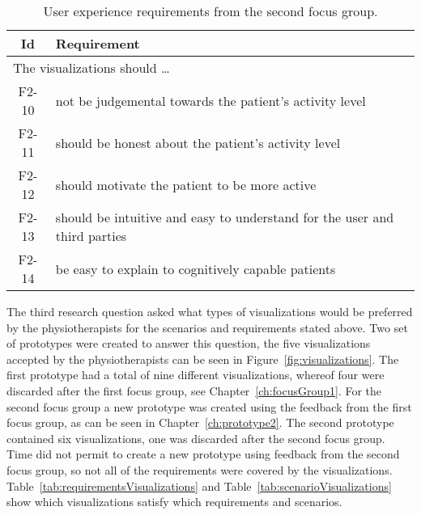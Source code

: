 \begin{table}[h!]
  \begin{center}
  \begin{tabular}{|c|p{12cm}|}
    \hline
      \textbf{Id} & \textbf{Requirement} \\ \hline
    \multicolumn{2}{|l|}{The visualizations should \ldots} \\ \hline
      F2-10 & not be judgemental towards the patient's activity level \\ \hline
      F2-11 & should be honest about the patient's activity level \\ \hline
      F2-12 & should motivate the patient to be more active \\ \hline
      F2-13 & should be intuitive and easy to understand for the user and third parties \\ \hline
      F2-14 & be easy to explain to cognitively capable patients \\ \hline
  \end{tabular}
  \end{center}
  \caption[Final user experience requirements]{User experience requirements from the second focus group.}
  \label{tab:f2ReqUxCon}
\end{table}

\clearpage

The third research question asked what types of visualizations would be preferred by the physiotherapists for the scenarios and requirements stated above. Two set of prototypes were created to answer this question, the five visualizations accepted by the physiotherapists can be seen in Figure~\ref{fig:visualizations}. The first prototype had a total of nine different visualizations, whereof four were discarded after the first focus group, see Chapter~\ref{ch:focusGroup1}. For the second focus group a new prototype was created using the feedback from the first focus group, as can be seen in Chapter~\ref{ch:prototype2}. The second prototype contained six visualizations, one was discarded after the second focus group. Time did not permit to create a new prototype using feedback from the second focus group, so not all of the requirements were covered by the visualizations. Table~\ref{tab:requirementsVisualizations} and Table~\ref{tab:scenarioVisualizations} show which visualizations satisfy which requirements and scenarios.

